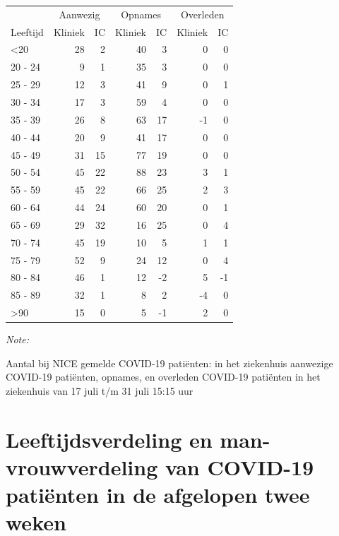\documentclass[
  english,
  man,floatsintext]{apa6}
\begin{document}
\begin{table}
\centering\begingroup\fontsize{10}{12}\selectfont

\begin{threeparttable}
\begin{tabular}{lrrrrrr}
\toprule
\multicolumn{1}{c}{ } & \multicolumn{2}{c}{Aanwezig} & \multicolumn{2}{c}{Opnames} & \multicolumn{2}{c}{Overleden} \\
\cmidrule(l{3pt}r{3pt}){2-3} \cmidrule(l{3pt}r{3pt}){4-5} \cmidrule(l{3pt}r{3pt}){6-7}
Leeftijd & Kliniek & IC & Kliniek & IC & Kliniek & IC\\
\midrule
<20 & 28 & 2 & 40 & 3 & 0 & 0\\
20 - 24 & 9 & 1 & 35 & 3 & 0 & 0\\
25 - 29 & 12 & 3 & 41 & 9 & 0 & 1\\
30 - 34 & 17 & 3 & 59 & 4 & 0 & 0\\
35 - 39 & 26 & 8 & 63 & 17 & -1 & 0\\
40 - 44 & 20 & 9 & 41 & 17 & 0 & 0\\
45 - 49 & 31 & 15 & 77 & 19 & 0 & 0\\
50 - 54 & 45 & 22 & 88 & 23 & 3 & 1\\
55 - 59 & 45 & 22 & 66 & 25 & 2 & 3\\
60 - 64 & 44 & 24 & 60 & 20 & 0 & 1\\
65 - 69 & 29 & 32 & 16 & 25 & 0 & 4\\
70 - 74 & 45 & 19 & 10 & 5 & 1 & 1\\
75 - 79 & 52 & 9 & 24 & 12 & 0 & 4\\
80 - 84 & 46 & 1 & 12 & -2 & 5 & -1\\
85 - 89 & 32 & 1 & 8 & 2 & -4 & 0\\
>90 & 15 & 0 & 5 & -1 & 2 & 0\\
\bottomrule
\end{tabular}
\begin{tablenotes}
\item \textit{Note: } 
\item Aantal bij NICE gemelde COVID-19 patiënten: in het ziekenhuis aanwezige COVID-19 patiënten, opnames, en overleden COVID-19 patiënten in het ziekenhuis van 17 juli t/m 31 juli 15:15 uur
\end{tablenotes}
\end{threeparttable}
\endgroup{}
\end{table}

\newpage

\hypertarget{leeftijdsverdeling-en-man-vrouwverdeling-van-covid-19-patiuxebnten-in-de-afgelopen-twee-weken}{%
\section{Leeftijdsverdeling en man-vrouwverdeling van COVID-19 patiënten in de afgelopen twee weken}\label{leeftijdsverdeling-en-man-vrouwverdeling-van-covid-19-patiuxebnten-in-de-afgelopen-twee-weken}}
\end{document}

